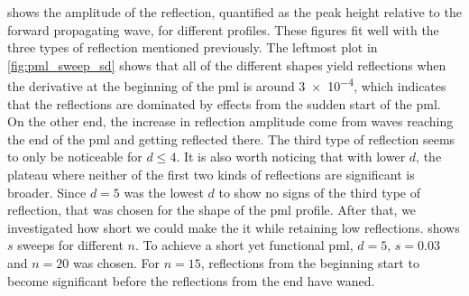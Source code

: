  shows the amplitude of the reflection,
quantified as the peak height relative to the forward propagating wave,
for different profiles.
These figures fit well with the three types of reflection mentioned previously.
The leftmost plot in \cref{fig:pml_sweep_sd} shows that all of the different
shapes yield reflections when the derivative at the beginning of the \gls{pml}
is around \num{3e-4}, which indicates that the reflections are dominated by
effects from the sudden start of the \gls{pml}.
On the other end, the increase in reflection amplitude come from
waves reaching the end of the \gls{pml} and getting reflected there.
The third type of reflection seems to only be noticeable for $d \leq 4$.
It is also worth noticing that with lower $d$, the plateau where neither of the
first two kinds of reflections are significant is broader.
Since $d=5$ was the lowest $d$ to show no signs of the third type of reflection,
that was chosen for the shape of the \gls{pml} profile.
After that, we investigated how short we could make the it while retaining
low reflections.  shows $s$ sweeps for different $n$.
To achieve a short yet functional \gls{pml}, $d=5$, $s=0.03$ and $n=20$ was
chosen.
For $n=15$, reflections from the beginning start to become significant before
the reflections from the end have waned.

